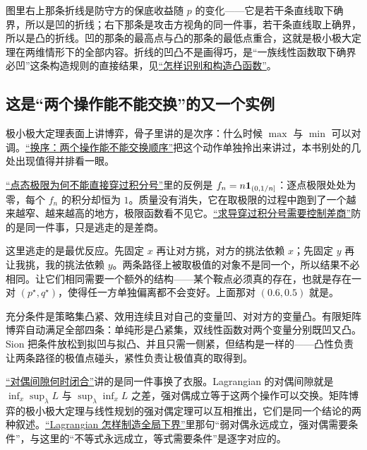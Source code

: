 图里右上那条折线是防守方的保底收益随 \(p\) 的变化——它是若干条直线取下确界，所以是凹的折线；右下那条是攻击方视角的同一件事，若干条直线取上确界，所以是凸的折线。凹的那条的最高点与凸的那条的最低点重合，这就是极小极大定理在两维情形下的全部内容。折线的凹凸不是画得巧，是``一族线性函数取下确界必凹''这条构造规则的直接结果，见\hyperref[sec:09-Convex-Optimization/03-Convex-Functions/04]{``怎样识别和构造凸函数''}。

\subsection{这是``两个操作能不能交换''的又一个实例}

极小极大定理表面上讲博弈，骨子里讲的是次序：什么时候 \(\max\) 与 \(\min\) 可以对调。\hyperref[sec:18-Synthesis/02-Recurring-Ideas/05]{``换序：两个操作能不能交换顺序''}把这个动作单独拎出来讲过，本书别处的几处出现值得并排看一眼。

\hyperref[sec:12-Real-Analysis-Support/04-Limits-and-Integration/01]{``点态极限为何不能直接穿过积分号''}里的反例是 \(f_n=n\mathbf{1}_{(0,1/n]}\)：逐点极限处处为零，每个 \(f_n\) 的积分却恒为 \(1\)。质量没有消失，它在取极限的过程中跑到了一个越来越窄、越来越高的地方，极限函数看不见它。\hyperref[sec:12-Real-Analysis-Support/04-Limits-and-Integration/03]{``求导穿过积分号需要控制差商''}防的是同一件事，只是逃走的是差商。

这里逃走的是最优反应。先固定 \(x\) 再让对方挑，对方的挑法依赖 \(x\)；先固定 \(y\) 再让我挑，我的挑法依赖 \(y\)。两条路径上被取极值的对象不是同一个，所以结果不必相同。让它们相同需要一个额外的结构——某个鞍点必须真的存在，也就是存在一对 \((p^\star,q^\star)\)，使得任一方单独偏离都不会变好。上面那对 \((0.6,0.5)\) 就是。

充分条件是策略集凸紧、效用连续且对自己的变量凹、对对方的变量凸。有限矩阵博弈自动满足全部四条：单纯形是凸紧集，双线性函数对两个变量分别既凹又凸。Sion 把条件放松到拟凹与拟凸、并且只需一侧紧，但结构是一样的——凸性负责让两条路径的极值点碰头，紧性负责让极值真的取得到。

\hyperref[sec:09-Convex-Optimization/05-Duality/02]{``对偶间隙何时闭合''}讲的是同一件事换了衣服。Lagrangian 的对偶间隙就是 \(\inf_x\sup_\lambda L\) 与 \(\sup_\lambda\inf_x L\) 之差，强对偶成立等于这两个操作可以交换。矩阵博弈的极小极大定理与线性规划的强对偶定理可以互相推出，它们是同一个结论的两种叙述。\hyperref[sec:09-Convex-Optimization/05-Duality/01]{``Lagrangian 怎样制造全局下界''}里那句``弱对偶永远成立，强对偶需要条件''，与这里的``不等式永远成立，等式需要条件''是逐字对应的。

